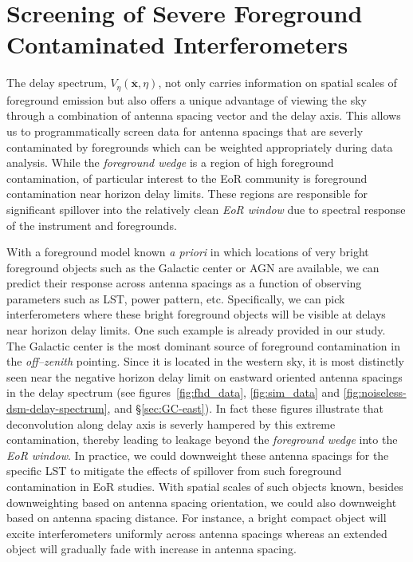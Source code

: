 \documentclass[preprint2,iop,numberedappendix]{emulateapj}
\begin{document}

\section{Screening of Severe Foreground Contaminated Interferometers}\label{sec:fg-grading}

The delay spectrum, $V_\eta(\overline{\mathbf{x}},\eta)$, not only carries information on spatial scales of foreground emission but also offers a unique advantage of viewing the sky through a combination of antenna spacing vector and the delay axis. This allows us to programmatically screen data for antenna spacings that are severly contaminated by foregrounds which can be weighted appropriately during data analysis. While the {\it foreground wedge} is a region of high foreground contamination, of particular interest to the EoR community is foreground contamination near horizon delay limits. These regions are responsible for significant spillover into the relatively clean {\it EoR window} due to spectral response of the instrument and foregrounds. 

With a foreground model known {\it a priori} in which locations of very bright foreground objects such as the Galactic center or AGN are available, we can predict their response across antenna spacings as a function of observing parameters such as LST, power pattern, etc. Specifically, we can pick interferometers where these bright foreground objects will be visible at delays near horizon delay limits. One such example is already provided in our study. The Galactic center is the most dominant source of foreground contamination in the {\it off--zenith} pointing. Since it is located in the western sky, it is most distinctly seen near the negative horizon delay limit on eastward oriented antenna spacings in the delay spectrum (see figures~\ref{fig:fhd_data}, \ref{fig:sim_data} and \ref{fig:noiseless-dsm-delay-spectrum}, and \S\ref{sec:GC-east}). In fact these figures illustrate that deconvolution along delay axis is severly hampered by this extreme contamination, thereby leading to leakage beyond the {\it foreground wedge} into the {\it EoR window}. In practice, we could downweight these antenna spacings for the specific LST to mitigate the effects of spillover from such foreground contamination in EoR studies. With spatial scales of such objects known, besides downweighting based on antenna spacing orientation, we could also downweight based on antenna spacing distance. For instance, a bright compact object will excite interferometers uniformly across antenna spacings whereas an extended object will gradually fade with increase in antenna spacing. 
\end{document}
